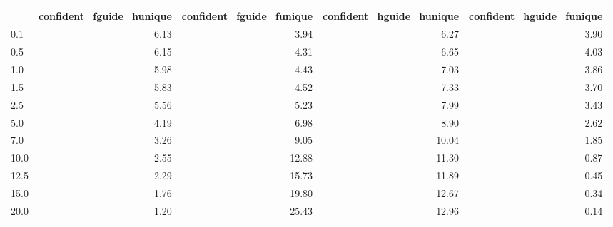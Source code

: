 \begin{tabular}{lrrrr}
\toprule
 & confident_fguide_hunique & confident_fguide_funique & confident_hguide_hunique & confident_hguide_funique \\
\midrule
0.1 & 6.13 & 3.94 & 6.27 & 3.90 \\
0.5 & 6.15 & 4.31 & 6.65 & 4.03 \\
1.0 & 5.98 & 4.43 & 7.03 & 3.86 \\
1.5 & 5.83 & 4.52 & 7.33 & 3.70 \\
2.5 & 5.56 & 5.23 & 7.99 & 3.43 \\
5.0 & 4.19 & 6.98 & 8.90 & 2.62 \\
7.0 & 3.26 & 9.05 & 10.04 & 1.85 \\
10.0 & 2.55 & 12.88 & 11.30 & 0.87 \\
12.5 & 2.29 & 15.73 & 11.89 & 0.45 \\
15.0 & 1.76 & 19.80 & 12.67 & 0.34 \\
20.0 & 1.20 & 25.43 & 12.96 & 0.14 \\
\bottomrule
\end{tabular}
